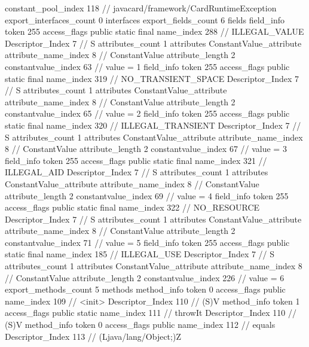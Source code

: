 {{{{				constant_pool_index	118		// javacard/framework/CardRuntimeException
			}
			export_interfaces_count	0
			interfaces {
			}
			export_fields_count	6
			fields {
			field_info {
				token	255
				access_flags	public static final
				name_index	288		// ILLEGAL_VALUE
				Descriptor_Index	7		// S
				attributes_count	1
				attributes {
				ConstantValue_attribute {
					attribute_name_index	8		// ConstantValue
					attribute_length	2
					constantvalue_index	63		// value = 1
				}
				}
			}
			field_info {
				token	255
				access_flags	public static final
				name_index	319		// NO_TRANSIENT_SPACE
				Descriptor_Index	7		// S
				attributes_count	1
				attributes {
				ConstantValue_attribute {
					attribute_name_index	8		// ConstantValue
					attribute_length	2
					constantvalue_index	65		// value = 2
				}
				}
			}
			field_info {
				token	255
				access_flags	public static final
				name_index	320		// ILLEGAL_TRANSIENT
				Descriptor_Index	7		// S
				attributes_count	1
				attributes {
				ConstantValue_attribute {
					attribute_name_index	8		// ConstantValue
					attribute_length	2
					constantvalue_index	67		// value = 3
				}
				}
			}
			field_info {
				token	255
				access_flags	public static final
				name_index	321		// ILLEGAL_AID
				Descriptor_Index	7		// S
				attributes_count	1
				attributes {
				ConstantValue_attribute {
					attribute_name_index	8		// ConstantValue
					attribute_length	2
					constantvalue_index	69		// value = 4
				}
				}
			}
			field_info {
				token	255
				access_flags	public static final
				name_index	322		// NO_RESOURCE
				Descriptor_Index	7		// S
				attributes_count	1
				attributes {
				ConstantValue_attribute {
					attribute_name_index	8		// ConstantValue
					attribute_length	2
					constantvalue_index	71		// value = 5
				}
				}
			}
			field_info {
				token	255
				access_flags	public static final
				name_index	185		// ILLEGAL_USE
				Descriptor_Index	7		// S
				attributes_count	1
				attributes {
				ConstantValue_attribute {
					attribute_name_index	8		// ConstantValue
					attribute_length	2
					constantvalue_index	226		// value = 6
				}
				}
			}
			}
			export_methods_count	5
			methods {
				method_info {
					token	0
					access_flags	public
					name_index	109		// <init>
					Descriptor_Index	110		// (S)V
				}
				method_info {
					token	1
					access_flags	public static
					name_index	111		// throwIt
					Descriptor_Index	110		// (S)V
				}
				method_info {
					token	0
					access_flags	public
					name_index	112		// equals
					Descriptor_Index	113		// (Ljava/lang/Object;)Z
}}}}}
